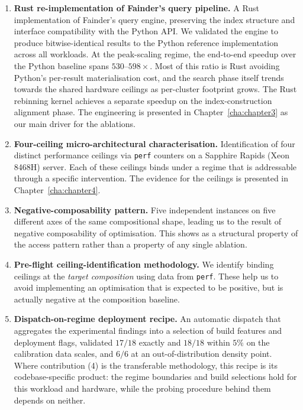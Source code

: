 \begin{enumerate}[label=(\arabic*),left=0pt]
    \item \textbf{Rust re-implementation of Fainder's query pipeline.} A Rust implementation of Fainder's query engine, preserving the index structure and interface compatibility with the Python API. We validated the engine to produce bitwise-identical results to the Python reference implementation across all workloads. At the peak-scaling regime, the end-to-end speedup over the Python baseline spans $530$--$598\times$. Most of this ratio is Rust avoiding Python's per-result materialisation cost, and the search phase itself trends towards the shared hardware ceilings as per-cluster footprint grows. The Rust rebinning kernel achieves a separate speedup on the index-construction alignment phase. The engineering is presented in Chapter~\ref{cha:chapter3} as our main driver for the ablations.

    \item \textbf{Four-ceiling micro-architectural characterisation.} Identification of four distinct performance ceilings via \texttt{perf} counters on a Sapphire Rapids (Xeon 8468H) server. Each of these ceilings binds under a regime that is addressable through a specific intervention. The evidence for the ceilings is presented in Chapter~\ref{cha:chapter4}.

    \item \textbf{Negative-composability pattern.} Five independent instances on five different axes of the same compositional shape, leading us to the result of negative composability of optimisation. This shows as a structural property of the access pattern rather than a property of any single ablation.

    \item \textbf{Pre-flight ceiling-identification methodology.} We identify binding ceilings at the \emph{target composition} using data from \texttt{perf}. These help us to avoid implementing an optimisation that is expected to be positive, but is actually negative at the composition baseline.

    \item \textbf{Dispatch-on-regime deployment recipe.} An automatic dispatch that aggregates the experimental findings into a selection of build features and deployment flags, validated $17/18$ exactly and $18/18$ within $5\%$ on the calibration data scales, and $6/6$ at an out-of-distribution density point. Where contribution (4) is the transferable methodology, this recipe is its codebase-specific product: the regime boundaries and build selections hold for this workload and hardware, while the probing procedure behind them depends on neither.
\end{enumerate}

